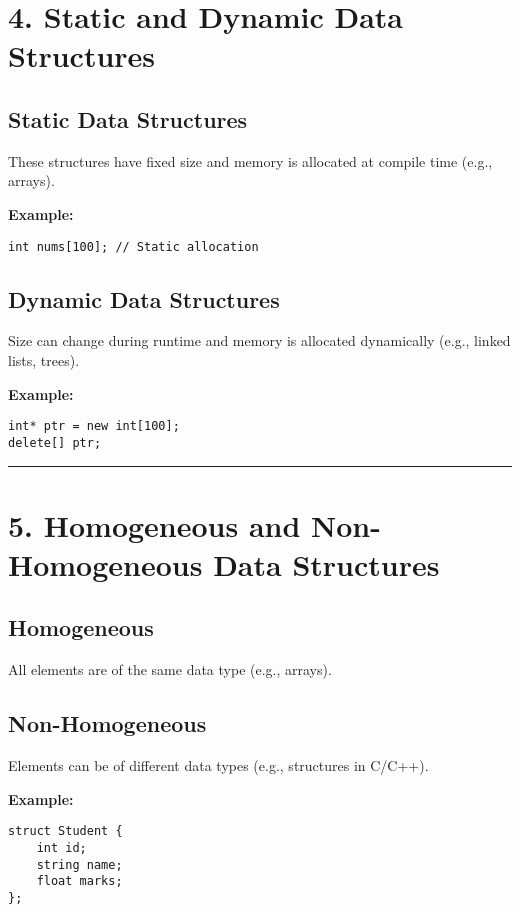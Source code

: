 \section*{\Large \textbf{4. Static and Dynamic Data Structures}}

\subsection*{\textbf{Static Data Structures}}
These structures have fixed size and memory is allocated at compile time (e.g., arrays).

\textbf{Example:}
\begin{lstlisting}
int nums[100]; // Static allocation
\end{lstlisting}

\subsection*{\textbf{Dynamic Data Structures}}
Size can change during runtime and memory is allocated dynamically (e.g., linked lists, trees).

\textbf{Example:}
\begin{lstlisting}
int* ptr = new int[100];
delete[] ptr;
\end{lstlisting}

\vspace{0.5cm}
\hrule
\vspace{0.5cm}

\section*{\Large \textbf{5. Homogeneous and Non-Homogeneous Data Structures}}

\subsection*{\textbf{Homogeneous}}
All elements are of the same data type (e.g., arrays).

\subsection*{\textbf{Non-Homogeneous}}
Elements can be of different data types (e.g., structures in C/C++).

\textbf{Example:}
\begin{lstlisting}
struct Student {
    int id;
    string name;
    float marks;
};
\end{lstlisting}

